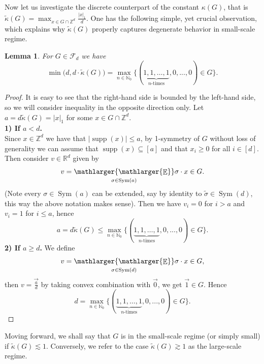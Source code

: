 \documentclass[a4paper,oneside, reqno]{amsart}
\numberwithin{equation}{section}
\newtheorem{Lem}[Thm]{Lemma}
\theoremstyle{definition}%
\theoremstyle{definition}
\theoremstyle{definition}%
\theoremstyle{definition}
\newcommand{\E}{\mathop{\mathbb{E}}}
\newcommand{\Z}{\mathbb{Z}}
\newcommand{\R}{\mathbb{R}}
\newcommand{\N}{\mathbb{N}}
\DeclareMathOperator{\Sym}{Sym}
\DeclareMathOperator{\supp}{supp}
\newcommand{\se}[1]{\underset{_{\substack{#1}}}{\mathlarger{\mathlarger{\E}}}}
\begin{document}
Now let us investigate the discrete counterpart of the constant $\kappa(G)$, that is $\widetilde{\kappa}(G)=\max_{x \in G \cap \Z^d} \frac{|x|_1}{d}$. One has the following simple, yet crucial observation, which explains why $\widetilde{\kappa}(G)$ properly captures degenerate behavior in small-scale regime.
\begin{Lem} \label{kappa tilde property}
    For $G \in \mathcal{F}_d$ we have
    \[
    \min\Big(d,d \cdot\widetilde{\kappa}(G) \Big)= \max_{n \in \N_0} \Big\{ (\underbrace{1,1,\ldots,1}_{n\text{-times}},0,...,0) \in G \Big\}.
    \]
\end{Lem}
\begin{proof}
    It is easy to see that the right-hand side is bounded by the left-hand side, so we will consider inequality in the opposite direction only. Let $a=d \widetilde{\kappa}(G)= |x|_1$ for some $x \in G \cap \Z^d$. \\
    \textbf{1) If $a<d$.} \\
    Since $x \in \Z^d$ we have that $| \supp(x)| \le a$, by 1-symmetry of $G$ without loss of generality we can assume that $\supp(x) \subseteq [a]$ and that $x_i \ge 0$ for all $i \in [d]$. Then consider $v \in \R^d$ given by 
    \[
    v= \se{\sigma \in \Sym(a)} \sigma \cdot x \in G.
    \]
    (Note every $\sigma \in \Sym(a)$ can be extended, say by identity to $\widetilde{\sigma} \in \Sym(d)$, this way the above notation makes sense).
    Then we have $v_i=0$ for $i>a$ and $v_i=1$ for $i \le a$, hence
    \[
    a=d\widetilde{\kappa}(G) \le  \max_{n \in \N_0} \Big\{ (\underbrace{1,1,\ldots,1}_{n\text{-times}},0,...,0) \in G \Big\}.
    \]
    \textbf{2) If $a \ge d$.}
    We define 
    \[
    v=\se{\sigma \in \Sym(d)} \sigma \cdot x \in G,
    \]
    then $v= \overrightarrow{\frac{a}{d}}$ by taking convex combination with $\overrightarrow{0}$, we get $\overrightarrow{1} \in G$.
    Hence
    \[
    d=\max_{n \in \N_0} \Big\{ (\underbrace{1,1,\ldots,1}_{n\text{-times}},0,...,0) \in G \Big\}.
    \]
\end{proof}
Moving forward, we shall say that $G$ is in the small-scale regime (or simply small) if $\widetilde{\kappa}(G) \lesssim 1$. Conversely, we refer to the case $\widetilde{\kappa}(G) \gtrsim 1$ as the large-scale regime. 
\end{document}
